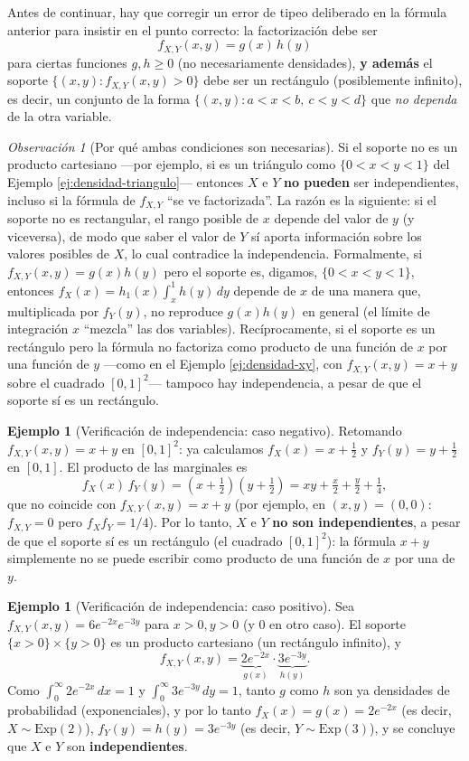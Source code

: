 \documentclass[11pt,a4paper]{article}
\theoremstyle{plain}
\theoremstyle{definition}
\newtheorem{ejemplo}[teorema]{Ejemplo}
\theoremstyle{remark}
\newtheorem{observacion}[teorema]{Observación}
\begin{document}
Antes de continuar, hay que corregir un error de tipeo deliberado en la fórmula anterior para insistir en el punto correcto: la factorización debe ser
\[
f_{X,Y}(x,y) = g(x)\,h(y)
\]
para ciertas funciones $g,h\ge0$ (no necesariamente densidades), \textbf{y además} el soporte $\{(x,y): f_{X,Y}(x,y)>0\}$ debe ser un rectángulo (posiblemente infinito), es decir, un conjunto de la forma $\{(x,y): a<x<b,\ c<y<d\}$ que \emph{no dependa} de la otra variable.

\begin{observacion}[Por qué ambas condiciones son necesarias]
Si el soporte no es un producto cartesiano —por ejemplo, si es un triángulo como $\{0<x<y<1\}$ del Ejemplo \ref{ej:densidad-triangulo}— entonces $X$ e $Y$ \textbf{no pueden} ser independientes, incluso si la fórmula de $f_{X,Y}$ ``se ve factorizada''. La razón es la siguiente: si el soporte no es rectangular, el rango posible de $x$ depende del valor de $y$ (y viceversa), de modo que saber el valor de $Y$ sí aporta información sobre los valores posibles de $X$, lo cual contradice la independencia. Formalmente, si $f_{X,Y}(x,y)=g(x)h(y)$ pero el soporte es, digamos, $\{0<x<y<1\}$, entonces $f_X(x) = h_1(x)\int_x^1 h(y)\,dy$ depende de $x$ de una manera que, multiplicada por $f_Y(y)$, no reproduce $g(x)h(y)$ en general (el límite de integración $x$ ``mezcla'' las dos variables). Recíprocamente, si el soporte es un rectángulo pero la fórmula no factoriza como producto de una función de $x$ por una función de $y$ —como en el Ejemplo \ref{ej:densidad-xy}, con $f_{X,Y}(x,y)=x+y$ sobre el cuadrado $[0,1]^2$— tampoco hay independencia, a pesar de que el soporte sí es un rectángulo.
\end{observacion}

\begin{ejemplo}[Verificación de independencia: caso negativo]
Retomando $f_{X,Y}(x,y)=x+y$ en $[0,1]^2$: ya calculamos $f_X(x)=x+\tfrac12$ y $f_Y(y)=y+\tfrac12$ en $[0,1]$. El producto de las marginales es
\[
f_X(x)\,f_Y(y) = \left(x+\tfrac12\right)\left(y+\tfrac12\right) = xy+\tfrac{x}{2}+\tfrac{y}{2}+\tfrac14,
\]
que no coincide con $f_{X,Y}(x,y)=x+y$ (por ejemplo, en $(x,y)=(0,0)$: $f_{X,Y}=0$ pero $f_Xf_Y=1/4$). Por lo tanto, $X$ e $Y$ \textbf{no son independientes}, a pesar de que el soporte sí es un rectángulo (el cuadrado $[0,1]^2$): la fórmula $x+y$ simplemente no se puede escribir como producto de una función de $x$ por una de $y$.
\end{ejemplo}

\begin{ejemplo}[Verificación de independencia: caso positivo]
Sea $f_{X,Y}(x,y)=6e^{-2x}e^{-3y}$ para $x>0,y>0$ (y $0$ en otro caso). El soporte $\{x>0\}\times\{y>0\}$ es un producto cartesiano (un rectángulo infinito), y
\[
f_{X,Y}(x,y) = \underbrace{2e^{-2x}}_{g(x)}\cdot\underbrace{3e^{-3y}}_{h(y)}.
\]
Como $\int_0^\infty 2e^{-2x}\,dx=1$ y $\int_0^\infty 3e^{-3y}\,dy=1$, tanto $g$ como $h$ son ya densidades de probabilidad (exponenciales), y por lo tanto $f_X(x)=g(x)=2e^{-2x}$ (es decir, $X\sim\text{Exp}(2)$), $f_Y(y)=h(y)=3e^{-3y}$ (es decir, $Y\sim\text{Exp}(3)$), y se concluye que $X$ e $Y$ son \textbf{independientes}.
\end{ejemplo}
\end{document}
